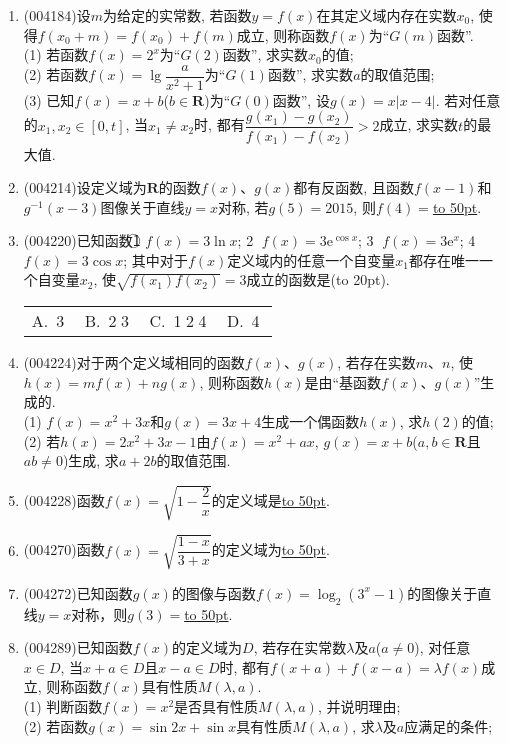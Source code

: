 \documentclass[10pt,a4paper]{article}
\newcommand{\blank}[1]{\underline{\hbox to #1pt{}}}
\newcommand{\bracket}[1]{(\hbox to #1pt{})}
\newcommand{\fourch}[4]{\par\begin{tabular}{p{.23\textwidth}p{.23\textwidth}p{.23\textwidth}p{.23\textwidth}}
A.~#1 &B.~#2& C.~#3& D.~#4
\end{tabular}}
\begin{document}
\begin{enumerate}[1.]
\item {\tiny (004184)}设$m$为给定的实常数, 若函数$y=f(x)$在其定义域内存在实数$x_0$, 使得$f(x_0+m)=f(x_0)+f(m)$成立, 则称函数$f(x)$为``$G(m)$函数''.\\
(1) 若函数$f(x)=2^x$为``$G(2)$函数'', 求实数$x_0$的值;\\
(2) 若函数$f(x)=\lg \dfrac a{x^2+1}$为``$G(1)$函数'', 求实数$a$的取值范围;\\
(3) 已知$f(x)=x+b$($b\in \mathbf{R}$)为``$G(0)$函数'', 设$g(x)=x|x-4|$. 若对任意的$x_1,x_2\in[0,t]$, 当$x_1\ne x_2$时, 都有$\dfrac{g(x_1)-g(x_2)}{f(x_1)-f(x_2)}>2$成立, 求实数$t$的最大值.
\item {\tiny (004214)}设定义域为$\mathbf{R}$的函数$f(x)$、$g(x)$都有反函数, 且函数$f(x-1)$和$g^{-1}(x-3)$图像关于直线$y=x$对称, 若$g(5)=2015$, 则$f(4)=$\blank{50}.
\item {\tiny (004220)}已知函数\textcircled{1} $f(x)=3\ln x$; \textcircled{2} $f(x)=3\mathrm{e}^{\cos x}$; \textcircled{3} $f(x)=3\mathrm{e}^x$; \textcircled{4} $f(x)=3\cos x$; 其中对于$f(x)$定义域内的任意一个自变量$x_1$都存在唯一一个自变量$x_2$, 使$\sqrt{f(x_1)f(x_2)}=3$成立的函数是\bracket{20}.
\fourch{\textcircled{3}}{\textcircled{2}\textcircled{3}}{\textcircled{1}\textcircled{2}\textcircled{4}}{\textcircled{4}}
\item {\tiny (004224)}对于两个定义域相同的函数$f(x)$、$g(x)$, 若存在实数$m$、$n$, 使$h(x)=mf(x)+ng(x)$, 则称函数$h(x)$是由``基函数$f(x)$、$g(x)$''生成的.\\
(1) $f(x)=x^2+3x$和$g(x)=3x+4$生成一个偶函数$h(x)$, 求$h(2)$的值;\\
(2) 若$h(x)=2x^2+3x-1$由$f(x)=x^2+ax$, $g(x)=x+b$($a,b\in \mathbf{R}$且$ab\ne 0$)生成, 求$a+2b$的取值范围.
\item {\tiny (004228)}函数$f(x)=\sqrt{1-\dfrac 2x}$的定义域是\blank{50}.
\item {\tiny (004270)}函数$f(x)=\sqrt{\dfrac{1-x}{3+x}}$的定义域为\blank{50}.
\item {\tiny (004272)}已知函数$g(x)$的图像与函数$f(x)=\log_2(3^x-1)$的图像关于直线$y=x$对称，则$g(3)=$\blank{50}.
\item {\tiny (004289)}已知函数$f(x)$的定义域为$D$, 若存在实常数$\lambda$及$a$($a\ne 0$), 对任意$x\in D$, 当$x+a\in D$且$x-a\in D$时, 都有$f(x+a)+f(x-a)=\lambda f(x)$成立, 则称函数$f(x)$具有性质$M(\lambda,a)$.\\
(1) 判断函数$f(x)=x^2$是否具有性质$M(\lambda,a)$, 并说明理由;\\
(2) 若函数$g(x)=\sin 2x+\sin x$具有性质$M(\lambda,a)$, 求$\lambda$及$a$应满足的条件;\\

\end{enumerate}
\end{document}

